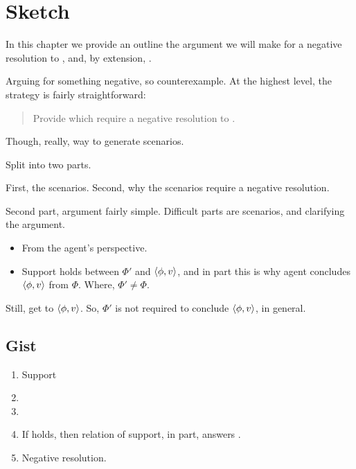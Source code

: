 \chapter{Sketch}
\label{cha:sketch}

\begin{note}
  In this chapter we provide an outline the argument we will make for a negative resolution to \issueConstraint{}, and, by extension, \issueInclusion{}.

  Arguing for something negative, so counterexample.
  At the highest level, the strategy is fairly straightforward:
  \begin{quote}
    Provide  which require a negative resolution to \issueConstraint{}.
  \end{quote}

  Though, really, way to generate scenarios.

  Split into two parts.

  First, the scenarios.
  Second, why the scenarios require a negative resolution.
\end{note}

\begin{note}
  Second part, argument fairly simple.
  Difficult parts are scenarios, and clarifying the argument.
\end{note}

\begin{note}[Goal]
  \begin{itemize}
  \item
    From the agent's perspective.
  \item
    Support holds between \(\Phi'\) and \(\langle \phi, v \rangle\), and in part this is why agent concludes \(\langle \phi, v \rangle\) from \(\Phi\).
    Where, \(\Phi' \ne \Phi\).
  \end{itemize}

  Still, get to \(\langle \phi, v \rangle\).
  So, \(\Phi'\) is not required to conclude \(\langle \phi, v \rangle\), in general.
\end{note}

\section{Gist}

\begin{note}
  \begin{enumerate}
  \item
    Support
  \item
  \item
    \qzS{}
  \item
    If \qzS{} holds, then relation of support, in part, answers \qWhy{}.
  \item
    Negative resolution.
  \end{enumerate}
\end{note}

